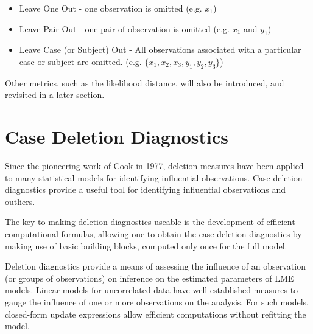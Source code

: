 \documentclass[12pt, a4paper]{report}
\theoremstyle{plain}
\theoremstyle{definition}
\theoremstyle{remark}
\begin{document}
\begin{itemize}
	\item Leave One Out - one observation is omitted (e.g. $x_1$)
	\item Leave Pair Out - one pair of observation  is omitted (e.g. $x_1$ and $y_1$)
	\item Leave Case (or Subject) Out - All observations associated with a particular case or subject are omitted. (e.g. $\{x_1,x_2,x_3,y_1,y_2,y_3\}$)
\end{itemize}
Other metrics, such as the likelihood distance, will also be introduced, and revisited in a later section.



%
%
\section{Case Deletion Diagnostics} %
Since the pioneering work of Cook in 1977, deletion measures have been applied to many statistical models for identifying influential observations. Case-deletion diagnostics provide a useful tool for identifying influential observations and outliers.


The key to making deletion diagnostics useable is the development of efficient computational formulas, allowing one to obtain the  case deletion diagnostics by making use of basic building blocks, computed only once for the full model.


Deletion diagnostics provide a means of assessing the influence of an observation (or groups of observations) on inference on the estimated parameters of LME models. Linear models for uncorrelated data have well established measures to gauge the influence of one or more observations on the analysis. For such models, closed-form update expressions allow efficient computations without refitting the model.
\end{document}
